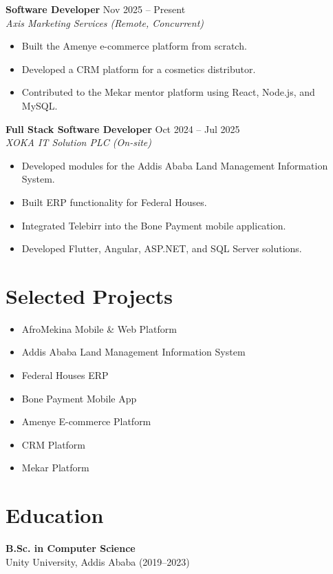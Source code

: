 \documentclass[11pt]{article}
\begin{document}
\textbf{Software Developer} \hfill Nov 2025 -- Present\\
\textit{Axis Marketing Services (Remote, Concurrent)}
\begin{itemize}
\item Built the Amenye e-commerce platform from scratch.
\item Developed a CRM platform for a cosmetics distributor.
\item Contributed to the Mekar mentor platform using React, Node.js, and MySQL.
\end{itemize}

\textbf{Full Stack Software Developer} \hfill Oct 2024 -- Jul 2025\\
\textit{XOKA IT Solution PLC (On-site)}
\begin{itemize}
\item Developed modules for the Addis Ababa Land Management Information System.
\item Built ERP functionality for Federal Houses.
\item Integrated Telebirr into the Bone Payment mobile application.
\item Developed Flutter, Angular, ASP.NET, and SQL Server solutions.
\end{itemize}

\section*{Selected Projects}
\begin{itemize}
\item AfroMekina Mobile \& Web Platform
\item Addis Ababa Land Management Information System
\item Federal Houses ERP
\item Bone Payment Mobile App
\item Amenye E-commerce Platform
\item CRM Platform
\item Mekar Platform
\end{itemize}

\section*{Education}
\textbf{B.Sc. in Computer Science}\\
Unity University, Addis Ababa (2019--2023)
\end{document}
